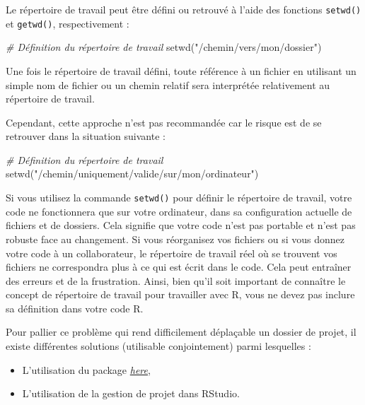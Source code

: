 \documentclass[
  french,
]{scrbook}
\newenvironment{Shaded}{\begin{snugshade}}{\end{snugshade}}
\newcommand{\CommentTok}[1]{\textcolor[rgb]{0.56,0.35,0.01}{\textit{#1}}}
\newcommand{\FunctionTok}[1]{\textcolor[rgb]{0.00,0.00,0.00}{#1}}
\newcommand{\NormalTok}[1]{#1}
\newcommand{\StringTok}[1]{\textcolor[rgb]{0.31,0.60,0.02}{#1}}
\providecommand{\tightlist}{%
  \setlength{\itemsep}{0pt}\setlength{\parskip}{0pt}}
\begin{document}
Le répertoire de travail peut être défini ou retrouvé à l'aide des fonctions \texttt{setwd()} et \texttt{getwd()}, respectivement :

\begin{Shaded}
\begin{Highlighting}[]
\CommentTok{\# Définition du répertoire de travail}
\FunctionTok{setwd}\NormalTok{(}\StringTok{"/chemin/vers/mon/dossier"}\NormalTok{)}
\end{Highlighting}
\end{Shaded}

Une fois le répertoire de travail défini, toute référence à un fichier en utilisant un simple nom de fichier ou un chemin relatif sera interprétée relativement au répertoire de travail.

Cependant, cette approche n'est pas recommandée car le risque est de se retrouver dans la situation suivante :

\begin{Shaded}
\begin{Highlighting}[]
\CommentTok{\# Définition du répertoire de travail}
\FunctionTok{setwd}\NormalTok{(}\StringTok{"/chemin/uniquement/valide/sur/mon/ordinateur"}\NormalTok{)}
\end{Highlighting}
\end{Shaded}

Si vous utilisez la commande \texttt{setwd()} pour définir le répertoire de travail, votre code ne fonctionnera que sur votre ordinateur, dans sa configuration actuelle de fichiers et de dossiers. Cela signifie que votre code n'est pas portable et n'est pas robuste face au changement. Si vous réorganisez vos fichiers ou si vous donnez votre code à un collaborateur, le répertoire de travail réel où se trouvent vos fichiers ne correspondra plus à ce qui est écrit dans le code. Cela peut entraîner des erreurs et de la frustration. Ainsi, bien qu'il soit important de connaître le concept de répertoire de travail pour travailler avec R, vous ne devez pas inclure sa définition dans votre code R.

Pour pallier ce problème qui rend difficilement déplaçable un dossier de projet, il existe différentes solutions (utilisable conjointement) parmi lesquelles :

\begin{itemize}
\tightlist
\item
  L'utilisation du package \href{https://here.r-lib.org/}{\emph{here}},
\item
  L'utilisation de la gestion de projet dans RStudio.
\end{itemize}
\end{document}
